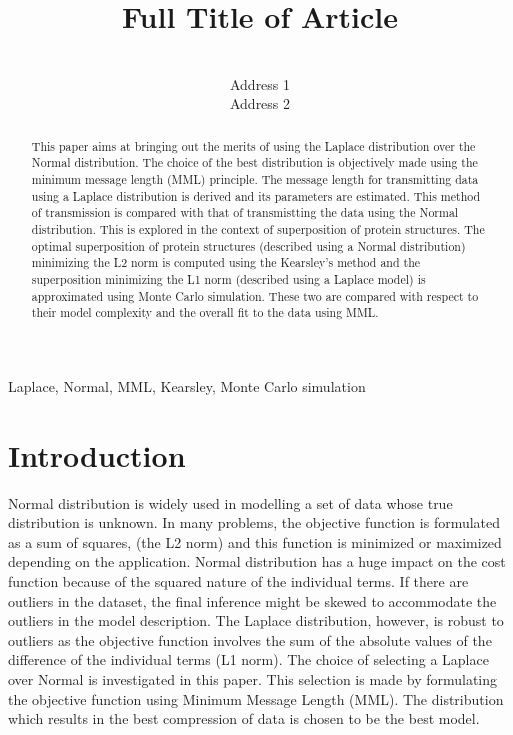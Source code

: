 \documentclass[wcp]{jmlr}
\title[Short Title]{Full Title of Article}
\author{\Name{Author Name1} \Email{abc@sample.com}\\
  \addr Address 1
  \AND
  \Name{Author Name2} \Email{xyz@sample.com}\\
  \addr Address 2
 }
\begin{document}
\maketitle

\begin{abstract}
This paper aims at bringing out the merits of using the Laplace distribution over
the Normal distribution. The choice of the best distribution is objectively
made using the minimum message length (MML) principle. The message length for
transmitting data using a Laplace distribution is derived and its parameters are
estimated. This method of transmission is compared with that of transmistting the data
using the Normal distribution. This is explored in the context of superposition
of protein structures. The optimal superposition of protein structures (described
using a Normal distribution) minimizing the L2 norm is computed using the 
Kearsley's method and the superposition minimizing the
L1 norm (described using a Laplace model) is approximated using Monte Carlo 
simulation. These two are compared with respect
to their model complexity and the overall fit to the data using MML. 
\end{abstract}

\begin{keywords}
Laplace, Normal, MML, Kearsley, Monte Carlo simulation
\end{keywords}

\section{Introduction}
Normal distribution is widely used in modelling a set of data whose true distribution
is unknown. In many problems, the objective function is formulated as a sum of squares,
(the L2 norm) and this function is minimized or maximized depending on the application. 
Normal distribution has a huge impact on the cost function because of the squared nature of 
the individual terms. If there are outliers in the dataset, the final inference might be 
skewed to accommodate the outliers in the model description. The Laplace distribution, 
however, is robust to
outliers as the objective function involves the sum of the absolute values of the difference 
of the individual terms (L1 norm).
The choice of selecting a Laplace over Normal is investigated in this paper. This
selection is made by formulating the objective function using Minimum Message
Length (MML). The distribution which results in the best compression of data is chosen
to be the best model. \\
\end{document}
